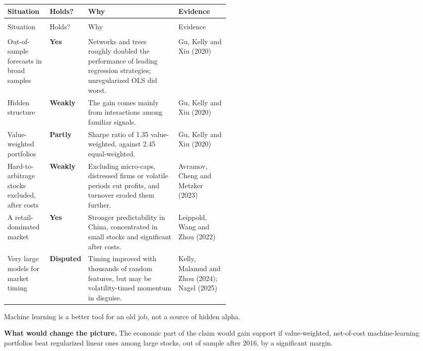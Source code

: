 {\small
\begin{longtable}{@{}>{\raggedright\arraybackslash}p{0.19\linewidth}>{\raggedright\arraybackslash}p{0.10\linewidth}>{\raggedright\arraybackslash}p{}>{\raggedright\arraybackslash}p{0.23\linewidth}@{}}
\toprule
Situation & Holds? & Why & Evidence \\
\midrule
\endfirsthead
\multicolumn{4}{@{}l}{\emph{(continued)}} \\
\toprule
Situation & Holds? & Why & Evidence \\
\midrule
\endhead
\midrule
\multicolumn{4}{r@{}}{\emph{(continued on the next page)}} \\
\endfoot
\bottomrule
\endlastfoot
Out-of-sample forecasts in broad samples & \textbf{Yes} & Networks and trees roughly doubled the performance of leading regression strategies; unregularized OLS did worst. & Gu, Kelly and Xiu (2020) \\
\addlinespace[3pt]
Hidden structure & \textbf{Weakly} & The gain comes mainly from interactions among familiar signals. & Gu, Kelly and Xiu (2020) \\
\addlinespace[3pt]
Value-weighted portfolios & \textbf{Partly} & Sharpe ratio of 1.35 value-weighted, against 2.45 equal-weighted. & Gu, Kelly and Xiu (2020) \\
\addlinespace[3pt]
Hard-to-arbitrage stocks excluded, after costs & \textbf{Weakly} & Excluding micro-caps, distressed firms or volatile periods cut profits, and turnover eroded them further. & Avramov, Cheng and Metzker (2023) \\
\addlinespace[3pt]
A retail-dominated market & \textbf{Yes} & Stronger predictability in China, concentrated in small stocks and significant after costs. & Leippold, Wang and Zhou (2022) \\
\addlinespace[3pt]
Very large models for market timing & \textbf{Disputed} & Timing improved with thousands of random features, but may be volatility-timed momentum in disguise. & Kelly, Malamud and Zhou (2024); Nagel (2025) \\
\end{longtable}
}

Machine learning is a better tool for an old job, not a source of hidden alpha.

\textbf{What would change the picture.} The economic part of the claim would gain support if value-weighted, net-of-cost machine-learning portfolios beat regularized linear ones among large stocks, out of sample after 2016, by a significant margin.

